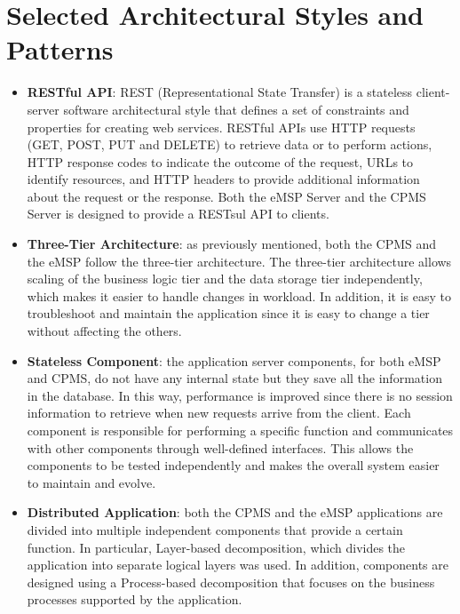 \documentclass{Configuration_Files/PoliMi3i_thesis}
\begin{document}
\section{Selected Architectural Styles and Patterns}

\begin{itemize}
    \item \textbf{RESTful API}: REST (Representational State Transfer) is a stateless client-server software architectural style that defines a set of constraints and properties for creating web services. RESTful APIs use HTTP requests (GET, POST, PUT and DELETE) to retrieve data or to perform actions, HTTP response codes to indicate the outcome of the request, URLs to identify resources, and HTTP headers to provide additional information about the request or the response. Both the eMSP Server and the CPMS Server is designed to provide a RESTsul API to clients.
    \item \textbf{Three-Tier Architecture}: as previously mentioned, both the CPMS and the eMSP follow the three-tier architecture. The three-tier architecture allows scaling of the business logic tier and the data storage tier independently, which makes it easier to handle changes in workload. In addition, it is easy to troubleshoot and maintain the application since it is easy to change a tier without affecting the others.
    \item \textbf{Stateless Component}: the application server components, for both eMSP and CPMS, do not have any internal state but they save all the information in the database. In this way, performance is improved since there is no session information to retrieve when new requests arrive from the client. Each component is responsible for performing a specific function and communicates with other components through well-defined interfaces. This allows the components to be tested independently and makes the overall system easier to maintain and evolve.
    \item \textbf{Distributed Application}: both the CPMS and the eMSP applications are divided into multiple independent components that provide a certain function. In particular, Layer-based decomposition, which divides the application into separate logical layers was used. In addition, components are designed using a Process-based decomposition that focuses on the business processes supported by the application.
\end{itemize}
\end{document}
